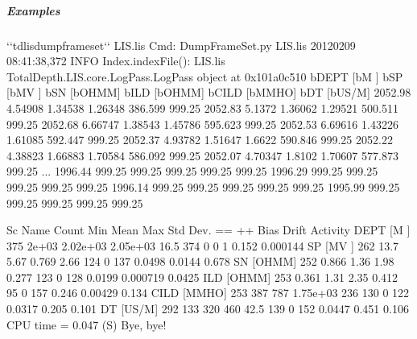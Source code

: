 \documentclass[letterpaper,10pt,english]{sphinxmanual}
\begin{document}
\subparagraph{Examples}
\label{\detokenize{cmd_line_tools/LIS_cmd_line_tools:id9}}
\begin{sphinxVerbatim}[commandchars=\\\{\}]
\PYGZdl{} {}`{}`tdlisdumpframeset{}`{}` LIS.lis
Cmd: DumpFrameSet.py LIS.lis
2012\PYGZhy{}02\PYGZhy{}09 08:41:38,372 INFO     Index.indexFile(): LIS.lis
\PYGZlt{}TotalDepth.LIS.core.LogPass.LogPass object at 0x101a0c510\PYGZgt{}
b\PYGZsq{}DEPT\PYGZsq{} [b\PYGZsq{}M   \PYGZsq{}]   b\PYGZsq{}SP  \PYGZsq{} [b\PYGZsq{}MV  \PYGZsq{}]   b\PYGZsq{}SN  \PYGZsq{} [b\PYGZsq{}OHMM\PYGZsq{}]   b\PYGZsq{}ILD \PYGZsq{} [b\PYGZsq{}OHMM\PYGZsq{}]   b\PYGZsq{}CILD\PYGZsq{} [b\PYGZsq{}MMHO\PYGZsq{}]   b\PYGZsq{}DT  \PYGZsq{} [b\PYGZsq{}US/M\PYGZsq{}]
2052.98 \PYGZhy{}4.54908    1.34538 1.26348 386.599 \PYGZhy{}999.25
2052.83 \PYGZhy{}5.1372     1.36062 1.29521 500.511 \PYGZhy{}999.25
2052.68 \PYGZhy{}6.66747    1.38543 1.45786 595.623 \PYGZhy{}999.25
2052.53 \PYGZhy{}6.69616    1.43226 1.61085 592.447 \PYGZhy{}999.25
2052.37 \PYGZhy{}4.93782    1.51647 1.6622  590.846 \PYGZhy{}999.25
2052.22 \PYGZhy{}4.38823    1.66883 1.70584 586.092 \PYGZhy{}999.25
2052.07 \PYGZhy{}4.70347    1.8102  1.70607 577.873 \PYGZhy{}999.25
...
1996.44 \PYGZhy{}999.25     \PYGZhy{}999.25 \PYGZhy{}999.25 \PYGZhy{}999.25 \PYGZhy{}999.25
1996.29 \PYGZhy{}999.25     \PYGZhy{}999.25 \PYGZhy{}999.25 \PYGZhy{}999.25 \PYGZhy{}999.25
1996.14 \PYGZhy{}999.25     \PYGZhy{}999.25 \PYGZhy{}999.25 \PYGZhy{}999.25 \PYGZhy{}999.25
1995.99 \PYGZhy{}999.25     \PYGZhy{}999.25 \PYGZhy{}999.25 \PYGZhy{}999.25 \PYGZhy{}999.25

Sc Name          Count      Min     Mean      Max Std Dev.       \PYGZhy{}\PYGZhy{}       ==       ++     Bias    Drift Activity
DEPT [M   ]        375    2e+03 2.02e+03 2.05e+03     16.5      374        0        0        1   \PYGZhy{}0.152 0.000144
SP   [MV  ]        262    \PYGZhy{}13.7    \PYGZhy{}5.67   \PYGZhy{}0.769     2.66      124        0      137  \PYGZhy{}0.0498   0.0144    0.678
SN   [OHMM]        252    0.866     1.36     1.98    0.277      123        0      128  \PYGZhy{}0.0199 \PYGZhy{}0.000719   0.0425
ILD  [OHMM]        253    0.361     1.31     2.35    0.412       95        0      157   \PYGZhy{}0.246  0.00429    0.134
CILD [MMHO]        253      387      787 1.75e+03      236      130        0      122   0.0317    0.205    0.101
DT   [US/M]        292      133      320      460     42.5      139        0      152  \PYGZhy{}0.0447   \PYGZhy{}0.451    0.106
CPU time =    0.047 (S)
Bye, bye!
\end{sphinxVerbatim}
\end{document}
